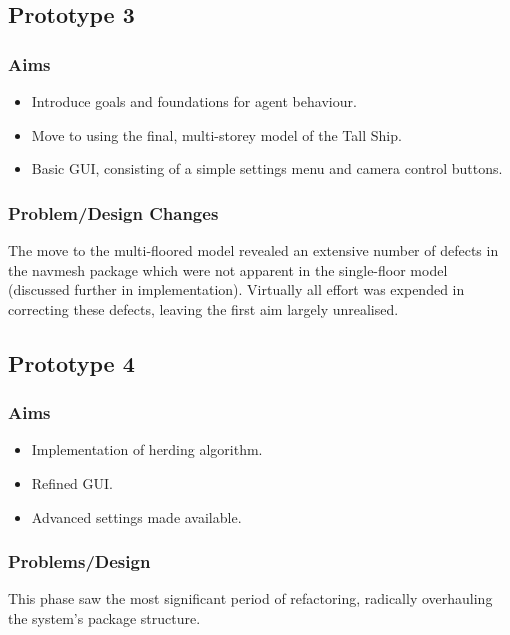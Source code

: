 \documentclass{article}
\begin{document}
\subsection{Prototype 3}
\subsubsection{Aims}
\begin{itemize}
\item{Introduce goals and foundations for agent behaviour.}
\item{Move to using the final, multi-storey model of the Tall Ship.}
\item{Basic GUI, consisting of a simple settings menu and camera control buttons.}
\end{itemize}
\subsubsection{Problem/Design Changes}
The move to the multi-floored model revealed an extensive number of defects in the navmesh package which were not apparent in the single-floor model (discussed further in implementation). Virtually all effort was expended in correcting these defects, leaving the first aim largely unrealised.

\subsection{Prototype 4}
\subsubsection{Aims}
\begin{itemize}
\item{Implementation of herding algorithm.}
\item{Refined GUI.}
\item{Advanced settings made available.}
\end{itemize}
\subsubsection{Problems/Design}
This phase saw the most significant period of refactoring, radically overhauling the system's package structure.
\end{document}
